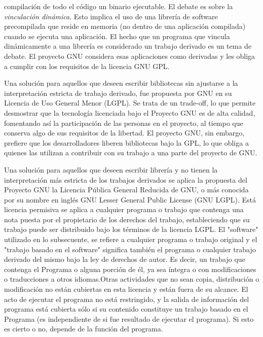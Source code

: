 	compilación de todo el código un binario ejecutable. El debate es sobre la \textit{vinculación dinámica}. Esto implica el uso de una librería de
	software precompilada que reside en memoria (no dentro de una aplicación compilada) cuando se ejecuta una aplicación. El hecho que un programa que 
	vincula dinámicamente a una librería es considerado un trabajo derivado es un tema de debate. El proyecto GNU considera esas aplicaciones como
	derivadas y les obliga a cumplir con los requisitos de la licencia GNU GPL.
	\vspace{0.5cm}
	\par	
 	Una solución para aquellos que deseen escribir bibliotecas sin ajustarse a la interpretación estricta de trabajo derivado, fue
 	propuesta por GNU en su Licencia de Uso General Menor (LGPL). Se trata de un trade-off, lo que permite desmostrar que la tecnología licenciada bajo
 	el Proyecto GNU es de alta calidad, fomentando así la participación de las personas en el proyecto, al tiempo que conserva algo de sus requisitos
 	de la libertad. El proyecto GNU, sin embargo, prefiere que los desarrolladores liberen bibliotecas bajo la GPL, lo que obliga a quienes las
 	utilizan a contribuir con su trabajo a una parte del proyecto de GNU.
	
	
	
	\vspace{0.5cm}
	\par	
	Una solución para aquellos que deseen escribir librería y no tienen la interpretación más estricta de los trabajos derivados se aplica la propuesta
 	del Proyecto GNU la Licencia Pública General Reducida de GNU, o más conocida por su nombre en inglés GNU Lesser General Public License (GNU LGPL). Está
 	licencia permisiva se aplica a cualquier programa o trabajo que contenga una nota puesta por el propietario de los derechos del trabajo,
 	estableciendo que su trabajo puede ser distribuido bajo los términos de la licencia LGPL. El "software" utilizado en lo subsecuente, se refiere a cualquier programa o trabajo original y el "trabajo basado en el software" significa también el programa o cualquier trabajo derivado del mismo bajo la ley de derechos de autor. Es decir, un trabajo que contenga el Programa o alguna porción de él, ya sea íntegra o con modificaciones o traducciones a otros idiomas.Otras actividades que no sean copia, distribución o modificación no están cubiertas en esta licencia y están fuera de su alcance. El acto de ejecutar el programa no está restringido, y la salida de información del programa está cubierta sólo si su contenido constituye un trabajo basado en el Programa (es independiente de si fue resultado de ejecutar el programa). Si esto es cierto o no, depende de la función del programa.\cite{Etiqueta03} 


